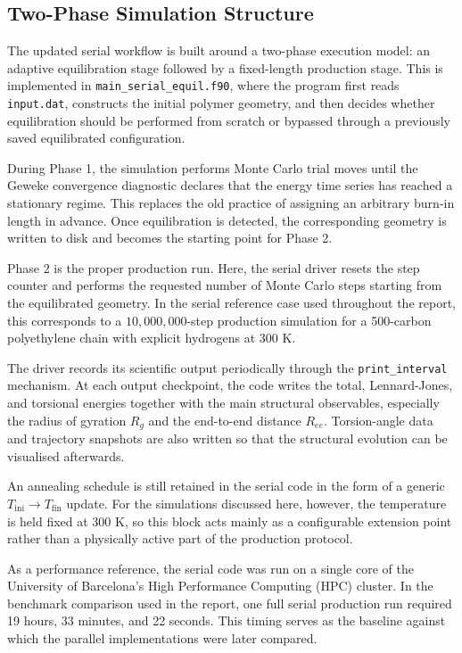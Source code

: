 \subsection{Two-Phase Simulation Structure}

The updated serial workflow is built around a two-phase execution model:
an adaptive equilibration stage followed by a fixed-length production
stage. This is implemented in \texttt{main\_serial\_equil.f90}, where the
program first reads \texttt{input.dat}, constructs the initial polymer
geometry, and then decides whether equilibration should be performed
from scratch or bypassed through a previously saved equilibrated
configuration.

During Phase 1, the simulation performs Monte Carlo trial moves until
the Geweke convergence diagnostic declares that the energy time series
has reached a stationary regime. This replaces the old practice of
assigning an arbitrary burn-in length in advance. Once equilibration is
detected, the corresponding geometry is written to disk and becomes the
starting point for Phase 2.

Phase 2 is the proper production run. Here, the serial driver resets the
step counter and performs the requested number of Monte Carlo steps
starting from the equilibrated geometry. In the serial reference case
used throughout the report, this corresponds to a \(10{,}000{,}000\)-step
production simulation for a 500-carbon polyethylene chain with explicit
hydrogens at 300 K.

The driver records its scientific output periodically through the
\texttt{print\_interval} mechanism. At each output checkpoint, the code
writes the total, Lennard-Jones, and torsional energies together with
the main structural observables, especially the radius of gyration
\(R_g\) and the end-to-end distance \(R_{ee}\). Torsion-angle data and
trajectory snapshots are also written so that the structural evolution
can be visualised afterwards.

An annealing schedule is still retained in the serial code in the form
of a generic \(T_{\mathrm{ini}}\rightarrow T_{\mathrm{fin}}\) update.
For the simulations discussed here, however, the temperature is held
fixed at 300 K, so this block acts mainly as a configurable extension
point rather than a physically active part of the production protocol.

As a performance reference, the serial code was run on a single core of
the University of Barcelona's High Performance Computing (HPC) cluster. 
In the benchmark comparison used in the report, one full serial production 
run required 19 hours, 33 minutes, and 22 seconds. This timing serves 
as the baseline against which the parallel implementations were later compared.

